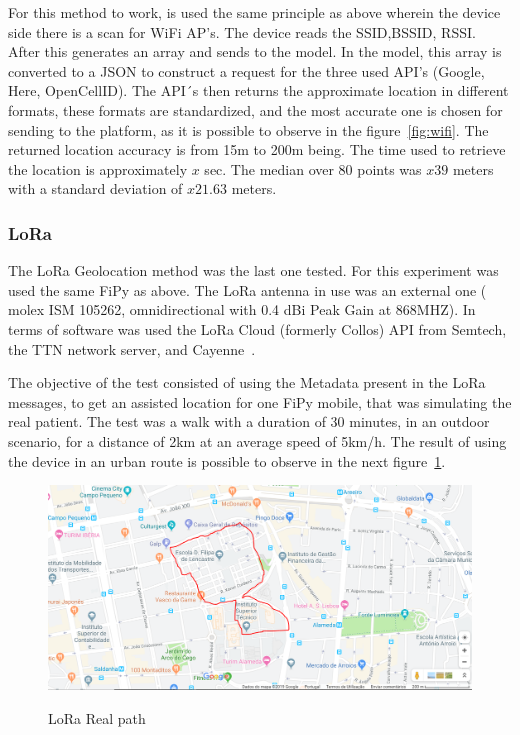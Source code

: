 For this method to work, is used the same principle as above wherein the device side there is a scan for WiFi AP's.  The device reads the  SSID,BSSID, RSSI.
After this generates an array and sends to the model. In the model, this array is converted to a JSON to construct a request for the three used API's (Google, Here, OpenCellID).
The API´s then returns the approximate location in different formats, these formats are standardized, and the most accurate one is chosen for sending to the platform,  as it is possible to observe in the figure~\ref{fig:wifi}.
The returned location accuracy is from  15m to 200m  being. The time used to retrieve the location is approximately $x$ sec. The median over 80 points was $x39$ meters with a standard deviation of $x21.63$ meters. 

\subsubsection{LoRa}
\label{subsubsec:LoRa}

The  LoRa Geolocation method was the last one tested. For this experiment was used the same FiPy as above. The LoRa antenna in use was an external one ( molex ISM 105262, omnidirectional with 0.4 dBi Peak Gain at 868MHZ). In terms of software was used the LoRa Cloud (formerly Collos) API from Semtech, the TTN network server, and Cayenne~\cite{cayenne}.

The objective of the test consisted of using the Metadata present in the LoRa messages, to get an assisted location for one FiPy mobile, that was simulating the real patient. The test was a walk with a duration of 30 minutes, in an outdoor scenario, for a distance of 2km at an average speed of 5km/h. The result of using the device in an urban route is possible to observe in the next figure~\ref{fig:lora_geo_realpath}.

\begin{figure}[htbp]
  \centering
  
    {\includegraphics[width=0.8\linewidth]{Chapters/Figures/lorageorespercurso101019.PNG}}%
 
  \caption{LoRa Real path}
  \label{fig:lora_geo_realpath}
\end{figure}

